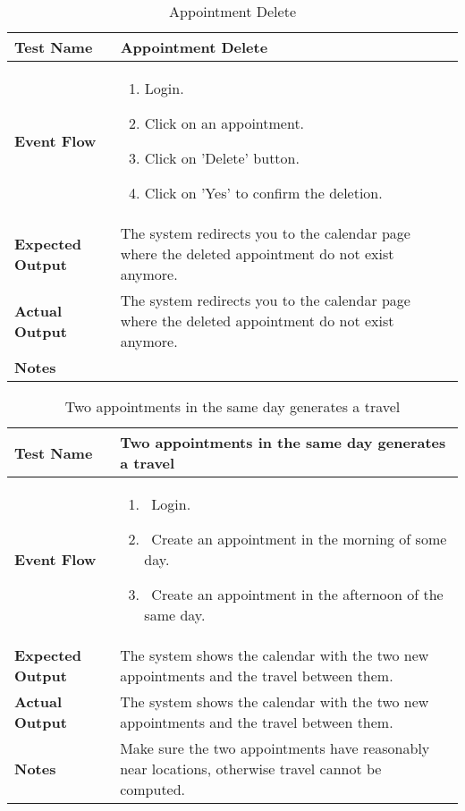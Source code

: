 \begin{table}[h]	
	\centering
	\def\arraystretch{1.5}
	\begin{tabular}{|m{7cm}|m{7cm}|}
		\hline
		\textbf{Test Name}            & Appointment Delete   \\ \hline
		\textbf{Event Flow}             & 
		\begin{enumerate}
			\item Login.
			\item Click on an appointment.
			\item Click on 'Delete' button.
			\item Click on 'Yes' to confirm the deletion.
		\end{enumerate} \\ \hline
		\textbf{Expected Output}  &  The system redirects you to the calendar page where the deleted appointment do not exist anymore.  \\ \hline
		\textbf{Actual Output}       & The system redirects you to the calendar page where the deleted appointment do not exist anymore.    \\ \hline
		\textbf{Notes} & \\ \hline
	\end{tabular}
	\caption{Appointment Delete}
\end{table}


\begin{table}[h]	
\centering
\def\arraystretch{1.5}
\begin{tabular}{|m{7cm}|m{7cm}|}
	\hline
	\textbf{Test Name}            &  Two appointments in the same day generates a travel  \\ \hline
	\textbf{Event Flow}             & 
		\begin{enumerate}
			\item~Login.
			\item~Create an appointment in the morning of some day.
			\item~Create an appointment in the afternoon of the same day.
		\end{enumerate}
	  \\ \hline
	\textbf{Expected Output}  &   The system shows the calendar with the two new appointments and the travel between them.  \\ \hline
	\textbf{Actual Output}       &  The system shows the calendar with the two new appointments and the travel between them.   \\ \hline
	\textbf{Notes} &  Make sure the two appointments have reasonably near locations, otherwise travel cannot be computed.  \\ \hline
\end{tabular}
\caption{Two appointments in the same day generates a travel}
\end{table}


